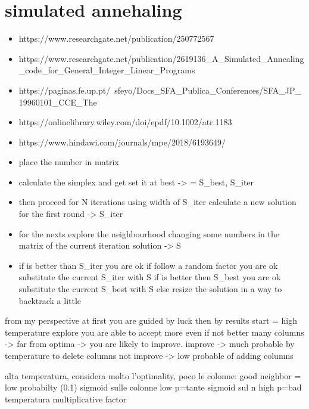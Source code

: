 \documentclass[11pt]{article}
\begin{document}
\section{simulated annehaling}
\begin{itemize}
    \item https://www.researchgate.net/publication/250772567
    \item https://www.researchgate.net/publication/2619136_A_Simulated_Annealing_code_for_General_Integer_Linear_Programs
    \item https://paginas.fe.up.pt/~sfeyo/Docs_SFA_Publica_Conferences/SFA_JP_19960101_CCE_The%
    \item https://onlinelibrary.wiley.com/doi/epdf/10.1002/atr.1183
    \item https://www.hindawi.com/journals/mpe/2018/6193649/
\end{itemize}

\begin{itemize}
    \item place the number in matrix
    \item calculate the simplex and get set it at best -> = S_best, S_iter
    \item then proceed for N iterations using width of S_iter calculate a new solution for the first round -> S_iter
    \item for the nexts explore the neighbourhood changing some numbers in the matrix of the current iteration solution -> S
    \item if is better than S_iter you are ok
    if follow a random factor you are ok
        substitute the current S_iter with S
        if is better then S_best you are ok
            substitute the current S_best with S
    else resize the solution in a way to backtrack a little
\end{itemize}

    from my perspective at first you are guided by luck then by results
    start = high temperature
        explore
        you are able to accept more even if not better 
        many columns -> far from optima -> you are likely to improve.
            improve -> much probable by temperature to delete columns
            not improve -> low probable of adding columns



    alta temperatura, considera molto l'optimality, poco le colonne: good neighbor = low probabilty (0.1)
    sigmoid sulle colonne   low p=tante
    sigmoid sul n           high p=bad
    temperatura multiplicative factor
    
\end{document}
